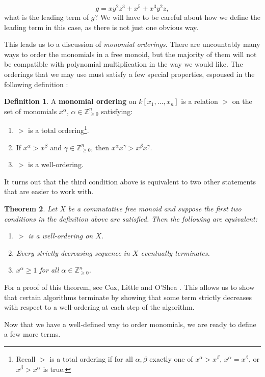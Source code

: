 \documentclass[MS, xcolor=dvipsnames]{wfuthesis}
\def\bZ{\mathbb{Z}}
\newtheorem{theorem}{Theorem}
\theoremstyle{definition}
\newtheorem{definition}[theorem]{Definition}
\begin{document}
\[ g = xy^2z^3 + x^5 + x^3y^2z, \]
what is the leading term of $g$? We will have to be careful about how we define the leading term in this case, as there is not just one obvious way. \par
This leads us to a discussion of \textit{monomial orderings}. There are uncountably many ways to order the monomials in a free monoid, but the majority of them will not be compatible with polynomial multiplication in the way we would like. The orderings that we may use must satisfy a few special properties, espoused in the following definition \cite{Cox2015}:
\begin{definition}
  A \textbf{monomial ordering} on $k[x_1,\dots,x_n]$ is a relation $>$ on the set of monomials $x^\alpha$, $\alpha \in \bZ_{\ge0}^n$ satisfying:
  \begin{enumerate}[label=(\roman*)]
    \item $>$ is a total ordering\footnote{Recall $>$ is a total ordering if for all $\alpha,\beta$ exactly one of $x^\alpha > x^\beta$, $x^\alpha = x^\beta$, or $x^\beta > x^\alpha$ is true.}.
    \item If $x^\alpha > x^\beta$ and $\gamma \in \bZ_{\ge0}^n$, then $x^\alpha x^\gamma > x^\beta x^\gamma$.
    \item $>$ is a well-ordering.
  \end{enumerate}
\end{definition}
It turns out that the third condition above is equivalent to two other statements that are easier to work with.
\begin{theorem}
  Let $X$ be a commutative free monoid and suppose the first two conditions in the definition above are satisfied. Then the following are equivalent:
  \begin{enumerate}
    \item $>$ is a well-ordering on $X$.
    \item Every strictly decreasing sequence in $X$ eventually terminates.
    \item $x^\alpha\ge1$ for all $\alpha \in \bZ_{\ge0}^n$.
  \end{enumerate}
\end{theorem}
For a proof of this theorem, see Cox, Little and O'Shea \cite{Cox2015}. This allows us to show that certain algorithms terminate by showing that some term strictly decreases with respect to a well-ordering at each step of the algorithm. \par
Now that we have a well-defined way to order monomials, we are ready to define a few more terms.
\end{document}
